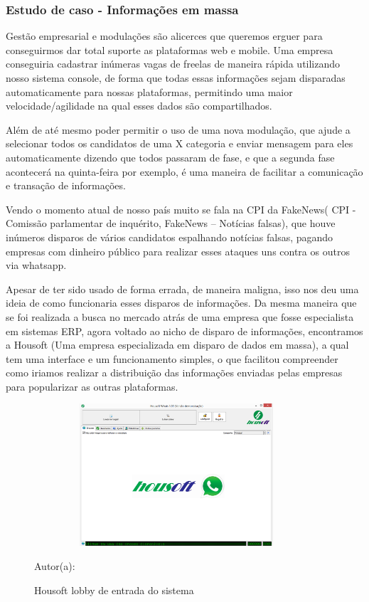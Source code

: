 \newpage

\subsubsection{Estudo de caso - Informações em massa}

Gestão empresarial e modulações são alicerces que queremos erguer para conseguirmos dar total suporte as plataformas web e mobile. Uma empresa conseguiria cadastrar inúmeras vagas de freelas de maneira rápida utilizando nosso sistema console, de forma que todas essas informações sejam disparadas automaticamente para nossas plataformas, permitindo uma maior velocidade/agilidade na qual esses dados são compartilhados.

Além de até mesmo poder permitir o uso de uma nova modulação, que ajude a selecionar todos os candidatos de uma X categoria e enviar mensagem para eles automaticamente dizendo que todos passaram de fase, e que a segunda fase acontecerá na quinta-feira por exemplo, é uma maneira de facilitar a comunicação e transação de informações.

Vendo o momento atual de nosso país muito se fala na CPI da FakeNews( CPI - Comissão parlamentar de inquérito, FakeNews – Notícias falsas), que houve inúmeros disparos de vários candidatos espalhando notícias falsas, pagando empresas com dinheiro público para realizar esses ataques uns contra os outros via whatsapp.

Apesar de ter sido usado de forma errada, de maneira maligna, isso nos deu uma ideia de como funcionaria esses disparos de informações. Da mesma maneira que se foi realizada a busca no mercado atrás de uma empresa que fosse especialista em sistemas ERP, agora voltado ao nicho de disparo de informações, encontramos a Housoft (Uma empresa especializada em disparo de dados em massa), a qual tem uma interface e um funcionamento simples, o que facilitou compreender como iriamos realizar a distribuição das informações enviadas pelas empresas para popularizar as outras plataformas.

\begin{figure}[!h]
	\centering
	\caption{Housoft lobby de entrada do sistema}
	\includegraphics[width=400px, height=200px]{./images/housoft.png}
	\par {Autor(a): \cite{housoft}}
\end{figure}

